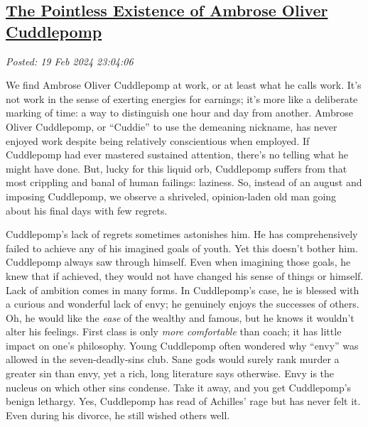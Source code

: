 %

\subsection*{\href{http://analyzethedatanotthedrivel.org/2024/02/19/the-pointless-existence-of-ambrose-oliver-cuddlepomp/}{The Pointless Existence of Ambrose Oliver Cuddlepomp}}


\noindent\emph{Posted: 19 Feb 2024 23:04:06}
\vspace{6pt}

We find Ambrose Oliver Cuddlepomp at work, or at least what he calls
work. It's not work in the sense of exerting energies for earnings; it's
more like a deliberate marking of time: a way to distinguish one hour
and day from another. Ambrose Oliver Cuddlepomp, or ``Cuddie'' to use
the demeaning nickname, has never enjoyed work despite being relatively
conscientious when employed. If Cuddlepomp had ever mastered sustained
attention, there's no telling what he might have done. But, lucky for
this liquid orb, Cuddlepomp suffers from that most crippling and banal
of human failings: laziness. So, instead of an august and imposing
Cuddlepomp, we observe a shriveled, opinion-laden old man going about
his final days with few regrets.

Cuddlepomp's lack of regrets sometimes astonishes him. He has
comprehensively failed to achieve any of his imagined goals of youth.
Yet this doesn't bother him. Cuddlepomp always saw through himself. Even
when imagining those goals, he knew that if achieved, they would not
have changed his sense of things or himself. Lack of ambition comes in
many forms. In Cuddlepomp's case, he is blessed with a curious and
wonderful lack of envy; he genuinely enjoys the successes of others. Oh,
he would like the \emph{ease} of the wealthy and famous, but he knows it
wouldn't alter his feelings. First class is only \emph{more comfortable}
than coach; it has little impact on one's philosophy. Young Cuddlepomp
often wondered why ``envy'' was allowed in the seven-deadly-sins club.
Sane gods would surely rank murder a greater sin than envy, yet a rich,
long literature says otherwise. Envy is the nucleus on which other sins
condense. Take it away, and you get Cuddlepomp's benign lethargy. Yes,
Cuddlepomp has read of Achilles' rage but has never felt it. Even during
his divorce, he still wished others well.

